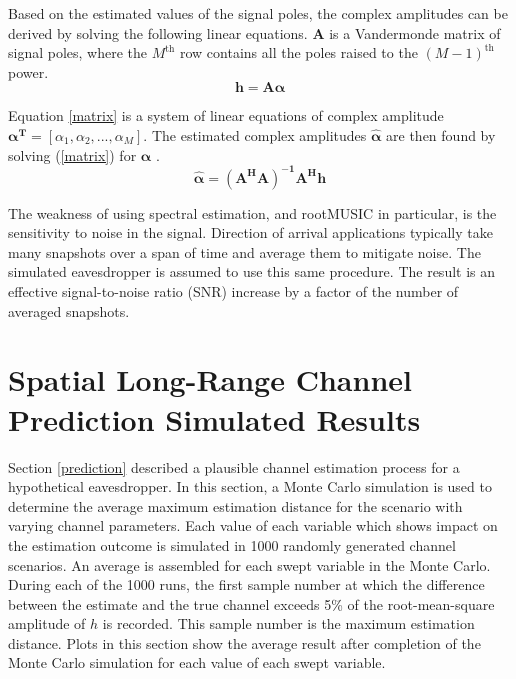 \documentclass{allertonproc}
\begin{document}
Based on the estimated values of the signal poles, the complex amplitudes can be derived by solving the following linear equations. $\boldsymbol{A}$ is a Vandermonde matrix of signal poles, where the $M^\mathrm{th}$ row contains all the poles raised to the $(M-1)^\mathrm{th}$ power. 
\begin{equation}\label{matrix}
\mathbf{h} = \mathbf{A \boldsymbol{\alpha}}
\end{equation}

Equation \ref{matrix} is a system of linear equations of complex amplitude $\boldsymbol{\alpha^T} = [\alpha_1, \alpha_2,... ,\alpha_M]$. The estimated complex amplitudes $\boldsymbol{\hat{\alpha}}$ are then found by solving (\ref{matrix}) for $\boldsymbol{\alpha}$ \cite{andersen1999}.
\begin{equation}\label{ahat}
\boldsymbol{\hat{\alpha}}=\boldsymbol{(A^HA)^{-1}A^Hh}
\end{equation}




The weakness of using spectral estimation, and rootMUSIC in particular, is the sensitivity to noise in the signal. Direction of arrival applications typically take many snapshots over a span of time and average them to mitigate noise. The simulated eavesdropper is assumed to use this same procedure. The result is an effective signal-to-noise ratio (SNR) increase by a factor of the number of averaged snapshots. 



\section{Spatial Long-Range Channel Prediction Simulated Results}\label{simresults}

Section \ref{prediction} described a plausible channel estimation process for a hypothetical eavesdropper. In this section, a Monte Carlo simulation is used to determine the average maximum estimation distance for the scenario with varying channel parameters. Each value of each variable which shows impact on the estimation outcome is simulated in 1000 randomly generated channel scenarios. An average is assembled for each swept variable in the Monte Carlo. During each of the 1000 runs, the first sample number at which the difference between the estimate and the true channel exceeds 5\% of the root-mean-square amplitude of $h$ is recorded.  This sample number is the maximum estimation distance.  Plots in this section show the average result after completion of the Monte Carlo simulation for each value of each swept variable.
\end{document}
